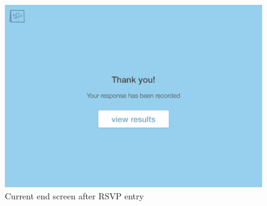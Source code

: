 \documentclass{sigchi}
\begin{document}
\begin{figure}
  \centering
  \includegraphics[width=1.75\columnwidth]{Mockup/RSVPResponse}
  \caption{Current end screen after RSVP entry}
\end{figure}
\FloatBarrier
\end{document}
